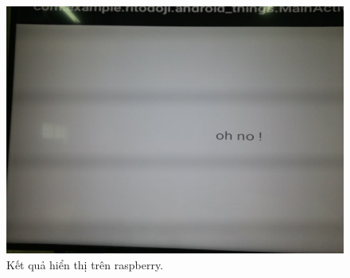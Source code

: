 \begin{center}
    \begin{figure}[htp]
    \begin{center}
     \includegraphics[scale=0.25]{image3/ketqua.jpg}
    \end{center}
    \caption{Kết quả hiển thị trên raspberry.}
    \label{refhinh1}
    \end{figure}
\end{center}
